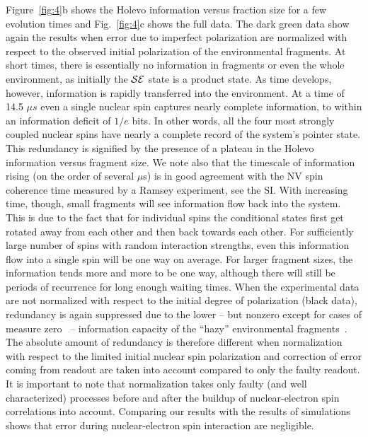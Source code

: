 \documentclass[aps,prl,floatfix,twocolumn,footinbib,superscriptaddress]{revtex4-1}
\begin{document}
Figure~\ref{fig:4}b shows the Holevo information versus fraction size for a few evolution times and Fig.~\ref{fig:4}c shows the full data. The dark green data show again the results when error due to imperfect polarization are normalized with respect to the observed initial polarization of the environmental fragments. At short times, there is essentially no information in fragments or even the whole environment, as initially the $\mathcal{S}\mathcal{E}$ state is a product state. As time develops, however, information is rapidly transferred into the environment. At a time of 14.5 $\mu s$ even a single nuclear spin captures nearly complete information, to within an information deficit of $1/e$ bits. In other words, all the four most strongly coupled nuclear spins have nearly a complete record of the system's pointer state. This redundancy is signified by the presence of a plateau in the Holevo information versus fragment size. We note also that the timescale of information rising (on the order of several $\mu$s) is in good agreement with the NV spin coherence time measured by a Ramsey experiment, see the SI. With increasing time, though, small fragments will see information flow back into the system. This is due to the fact that for individual spins the conditional states first get rotated away from each other and then back towards each other. For sufficiently large number of spins with random interaction strengths, even this information flow into a single spin will be one way on average. For larger fragment sizes, the information tends more and more to be one way, although there will still be periods of recurrence for long enough waiting times. When the experimental data are not normalized with respect to the initial degree of polarization (black data), redundancy is again suppressed due to the lower -- but nonzero except for cases of measure zero~\cite{Zwolak14,zwolak16} -- information capacity of the ``hazy'' environmental fragments~\cite{Zwolak09,Zwolak10-1}. The absolute amount of redundancy is therefore different when normalization with respect to the limited initial nuclear spin polarization and correction of error coming from readout are taken into account compared to only the faulty readout. It is important to note that normalization takes only faulty (and well characterized) processes before and after the buildup of nuclear-electron spin correlations into account. Comparing our results with the results of simulations shows that error during nuclear-electron spin interaction are negligible.
\end{document}
